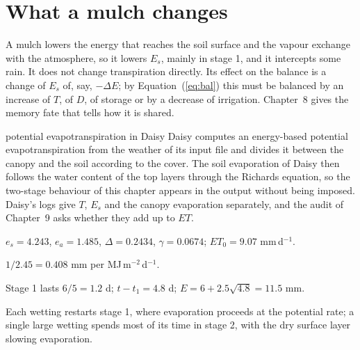
\section{What a mulch changes}
A mulch lowers the energy that reaches the soil surface and the vapour exchange with the atmosphere, so it lowers $E_s$, mainly in stage 1, and it intercepts some rain. It does not change transpiration directly. Its effect on the balance is a change of $E_s$ of, say, $-\Delta E$; by Equation~(\ref{eq:bal}) this must be balanced by an increase of $T$, of $D$, of storage or by a decrease of irrigation. Chapter~8 gives the memory fate that tells how it is shared.

\begin{daisybox}{potential evapotranspiration in Daisy}
Daisy computes an energy-based potential evapotranspiration from the weather of its input file and divides it between the canopy and the soil according to the cover. The soil evaporation of Daisy then follows the water content of the top layers through the Richards equation, so the two-stage behaviour of this chapter appears in the output without being imposed. Daisy's logs give $T$, $E_s$ and the canopy evaporation separately, and the audit of Chapter~9 asks whether they add up to $ET$.
\end{daisybox}

\sol {}\ans $e_s=4.243$, $e_a=1.485$, $\Delta=0.2434$, $\gamma=0.0674$; $ET_0=9.07$ mm\,d$^{-1}$. \finans

\sol {}\ans $1/2.45=0.408$ mm per MJ\,m$^{-2}$\,d$^{-1}$. \finans

\sol {}\ans Stage 1 lasts $6/5=1.2$ d; $t-t_1=4.8$ d; $E=6+2.5\sqrt{4.8}=11.5$ mm. \finans

\sol  Each wetting restarts stage 1, where evaporation proceeds at the potential rate; a single large wetting spends most of its time in stage 2, with the dry surface layer slowing evaporation.
